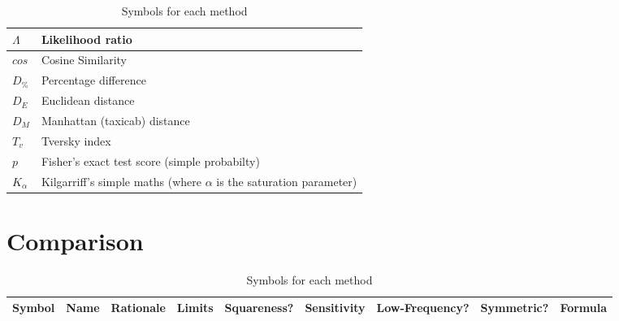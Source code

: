 \documentclass[11pt]{article}
\begin{document}
\begin{table}[h]
\begin{tabular}{|l|l|}
$\Lambda$           & Likelihood ratio\\ \hline
$cos$               & Cosine Similarity\\ \hline
$D_\%$              & Percentage difference \\ \hline
$D_E$               & Euclidean distance\\ \hline
$D_M$               & Manhattan (taxicab) distance\\ \hline
$T_v$               & Tversky index\\ \hline
$p$                 & Fisher's exact test score (simple probabilty)\\ \hline
$K_{\alpha}$        & Kilgarriff's simple maths (where $\alpha$ is the saturation parameter)\\ \hline
\end{tabular}
\caption{Symbols for each method}
\label{tab:symbols}
\end{table}



\section{Comparison}
\begin{landscape}
\begin{table}[h]
\centering
\begin{tabular}{|l|l|l|l|l|l|l|l|l|}
\hline
\textbf{Symbol} & \textbf{Name} & \textbf{Rationale} & \textbf{Limits} & \textbf{Squareness?} & \textbf{Sensitivity} & \textbf{Low-Frequency?} & \textbf{Symmetric?} & \textbf{Formula} \\
\hline


\end{tabular}
\caption{Symbols for each method}
\label{tab:symbols}
\end{table}

\end{landscape}








\end{document}
